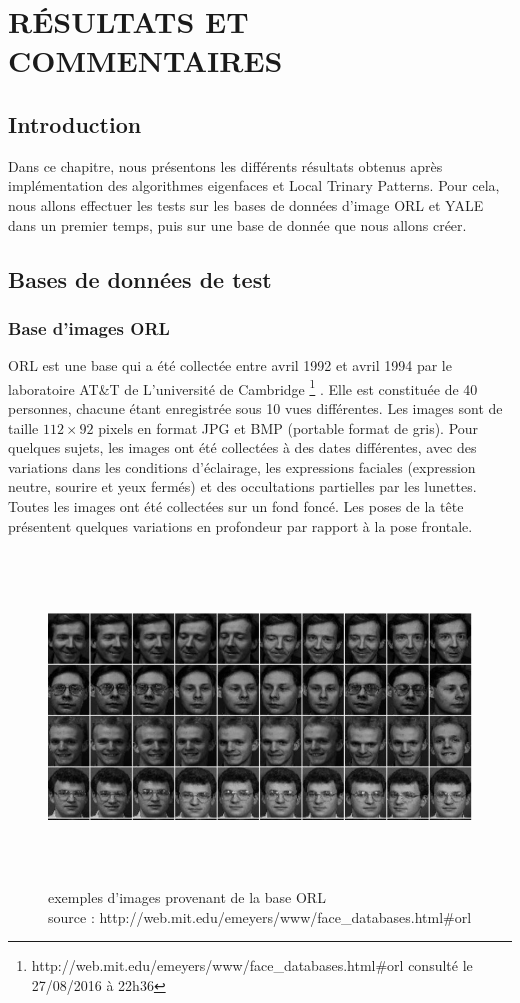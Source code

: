 \chapter{RÉSULTATS ET COMMENTAIRES}
\section{Introduction}
Dans ce chapitre, nous présentons les différents résultats obtenus après implémentation des algorithmes eigenfaces et Local Trinary Patterns. Pour cela, nous allons effectuer les tests sur les bases de données d'image ORL et YALE dans un premier temps, puis sur une base de donnée que nous allons créer.
\section{Bases de données de test}
\subsection{Base d'images ORL}\label{orl}
ORL est une base qui a été collectée entre avril 1992 et avril 1994 par le laboratoire AT\&T de
L'université  de Cambridge \footnote{http://web.mit.edu/emeyers/www/face\_databases.html\#orl consulté le 27/08/2016 à 22h36} . Elle est constituée de 40 personnes, chacune étant enregistrée sous 10 vues différentes. Les images sont de taille $112 \times 92$ pixels en format JPG et BMP
(portable  format  de  gris).  Pour  quelques  sujets,  les  images  ont  été  collectées  à  des  dates 
différentes,  avec  des  variations  dans  les  conditions  d'éclairage,  les  expressions  faciales 
(expression neutre, sourire et yeux fermés) et des occultations partielles par les lunettes. Toutes 
les  images  ont  été  collectées  sur  un  fond  foncé.  Les  poses  de  la  tête  présentent  quelques 
variations en profondeur par rapport à la pose frontale.

\begin{figure}[h]
 \caption[exemples d'images provenant de la base ORL]{exemples d'images provenant de la base ORL \\
source : http://web.mit.edu/emeyers/www/face\_databases.html\#orl}
	\centering
	
		\includegraphics[width=450pt,height=250pt]{imagefromorl.JPG}
		
	\label{fig:imagefromorl}
\end{figure}
\newpage

